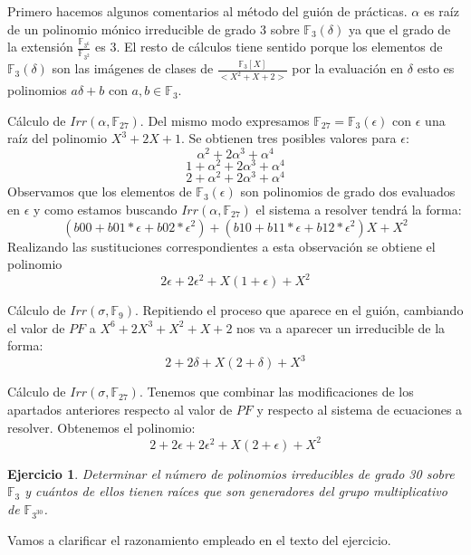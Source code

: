 \documentclass{article}
\theoremstyle{theorem-style}  %
\theoremstyle{definition-style}
\theoremstyle{example-style}
\newtheorem{exercise}{Ejercicio}[section]
\begin{document}
Primero hacemos algunos comentarios al método del guión de prácticas. $\alpha$ es raíz de un polinomio mónico irreducible de grado 3 sobre $\mathbb{F}_3(\delta)$ ya que el grado de la extensión $\frac{\mathbb{F}_{3^6}}{\mathbb{F}_{3^2}}$ es 3. El resto de cálculos tiene sentido porque los elementos de $\mathbb{F}_3(\delta)$ son las imágenes de clases de $\frac{\mathbb{F}_3[X]}{<X^2+X+2>}$ por la evaluación en $\delta$ esto es polinomios $a\delta + b$ con $a,b \in \mathbb{F}_3$. 

Cálculo de $Irr(\alpha,\mathbb{F}_{27})$. Del mismo modo expresamos $\mathbb{F}_{27} = \mathbb{F}_3(\epsilon)$ con $\epsilon$ una raíz del polinomio $X^3 + 2X + 1$.  Se obtienen tres posibles valores para $\epsilon$: $$\alpha^2+2\alpha^3+\alpha^4$$ $$1+\alpha^2+2\alpha^3+\alpha^4$$ $$2+\alpha^2+2\alpha^3+\alpha^4$$ Observamos que los elementos de $\mathbb{F}_3(\epsilon)$ son polinomios de grado dos evaluados en $\epsilon$ y como estamos buscando $Irr(\alpha,\mathbb{F}_{27})$ el sistema a resolver tendrá la forma: $$(b00 + b01*\epsilon + b02*\epsilon^2) + (b10 + b11*\epsilon + b12*\epsilon^2) X + X^2$$ Realizando las sustituciones correspondientes a esta observación se obtiene el polinomio $$2 \epsilon + 2 \epsilon^2 + X (1 + \epsilon) + X^2$$

Cálculo de $Irr(\sigma,\mathbb{F}_9)$. Repitiendo el proceso que aparece en el guión, cambiando el valor de $PF$ a $X^6+2X^3+X^2+X+2$ nos va a aparecer un irreducible de la forma: $$2 + 2 \delta + X (2 + \delta) + X^3$$ 

Cálculo de $Irr(\sigma,\mathbb{F}_{27})$. Tenemos que combinar las modificaciones de los apartados anteriores respecto al valor de $PF$ y respecto al sistema de ecuaciones a resolver. Obtenemos el polinomio: $$2 + 2 \epsilon + 2 \epsilon^2 + X (2 + \epsilon) + X^2$$

\begin{exercise}
	Determinar el número de polinomios irreducibles de grado 30 sobre $\mathbb{F}_3$ y cuántos de ellos tienen raíces que son generadores del grupo multiplicativo de $\mathbb{F}_{3^{30}}$.
\end{exercise}

Vamos a clarificar el razonamiento empleado en el texto del ejercicio.
\end{document}
